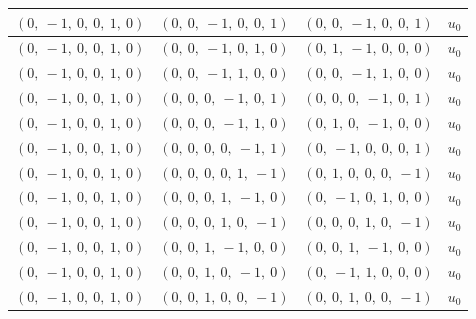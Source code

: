 \documentclass[11pt]{article}
\theoremstyle{definition}
\begin{document}
\begin{longtable}{|l|l|l|c|}
    \hline
    $\left( 0, \  -1, \  0, \  0, \  1, \  0\right)$ & $\left( 0, \  0, \  -1, \  0, \  0, \  1\right)$ & $\left( 0, \  0, \  -1, \  0, \  0, \  1\right)$ & $u_{0}$ \\
    \hline
    $\left( 0, \  -1, \  0, \  0, \  1, \  0\right)$ & $\left( 0, \  0, \  -1, \  0, \  1, \  0\right)$ & $\left( 0, \  1, \  -1, \  0, \  0, \  0\right)$ & $u_{0}$ \\
    \hline
    $\left( 0, \  -1, \  0, \  0, \  1, \  0\right)$ & $\left( 0, \  0, \  -1, \  1, \  0, \  0\right)$ & $\left( 0, \  0, \  -1, \  1, \  0, \  0\right)$ & $u_{0}$ \\
    \hline
    $\left( 0, \  -1, \  0, \  0, \  1, \  0\right)$ & $\left( 0, \  0, \  0, \  -1, \  0, \  1\right)$ & $\left( 0, \  0, \  0, \  -1, \  0, \  1\right)$ & $u_{0}$ \\
    \hline
    $\left( 0, \  -1, \  0, \  0, \  1, \  0\right)$ & $\left( 0, \  0, \  0, \  -1, \  1, \  0\right)$ & $\left( 0, \  1, \  0, \  -1, \  0, \  0\right)$ & $u_{0}$ \\
    \hline
    $\left( 0, \  -1, \  0, \  0, \  1, \  0\right)$ & $\left( 0, \  0, \  0, \  0, \  -1, \  1\right)$ & $\left( 0, \  -1, \  0, \  0, \  0, \  1\right)$ & $u_{0}$ \\
    \hline
    $\left( 0, \  -1, \  0, \  0, \  1, \  0\right)$ & $\left( 0, \  0, \  0, \  0, \  1, \  -1\right)$ & $\left( 0, \  1, \  0, \  0, \  0, \  -1\right)$ & $u_{0}$ \\
    \hline
    $\left( 0, \  -1, \  0, \  0, \  1, \  0\right)$ & $\left( 0, \  0, \  0, \  1, \  -1, \  0\right)$ & $\left( 0, \  -1, \  0, \  1, \  0, \  0\right)$ & $u_{0}$ \\
    \hline
    $\left( 0, \  -1, \  0, \  0, \  1, \  0\right)$ & $\left( 0, \  0, \  0, \  1, \  0, \  -1\right)$ & $\left( 0, \  0, \  0, \  1, \  0, \  -1\right)$ & $u_{0}$ \\
    \hline
    $\left( 0, \  -1, \  0, \  0, \  1, \  0\right)$ & $\left( 0, \  0, \  1, \  -1, \  0, \  0\right)$ & $\left( 0, \  0, \  1, \  -1, \  0, \  0\right)$ & $u_{0}$ \\
    \hline
    $\left( 0, \  -1, \  0, \  0, \  1, \  0\right)$ & $\left( 0, \  0, \  1, \  0, \  -1, \  0\right)$ & $\left( 0, \  -1, \  1, \  0, \  0, \  0\right)$ & $u_{0}$ \\
    \hline
    $\left( 0, \  -1, \  0, \  0, \  1, \  0\right)$ & $\left( 0, \  0, \  1, \  0, \  0, \  -1\right)$ & $\left( 0, \  0, \  1, \  0, \  0, \  -1\right)$ & $u_{0}$ \\

\end{longtable}
\end{document}
